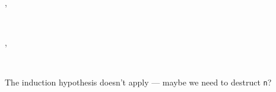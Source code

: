 \documentclass[a4paper]{article}
\begin{document}
\begin{alectryon}
\begin{sentence}
\begin{output}
\begin{goals}
\begin{goal}
\begin{conclusion}
          \end{conclusion}
        \end{goal}
      \end{goals}
    \end{output}
  \end{sentence}
  \sep
  \begin{sentence}
    \begin{input}
      ~~~~~~
    \end{input}
    \sep
    \begin{output}
      \begin{messages}
        \begin{message}
          ~\nl
          ~~\nl
          ~~~~~~~~\nl
          ~~~~\nl
          ~
        \end{message}
      \end{messages}
    \end{output}
  \end{sentence}
\end{alectryon}

The induction hypothesis doesn't apply — maybe we need to destruct \texttt{n}?
\end{document}
